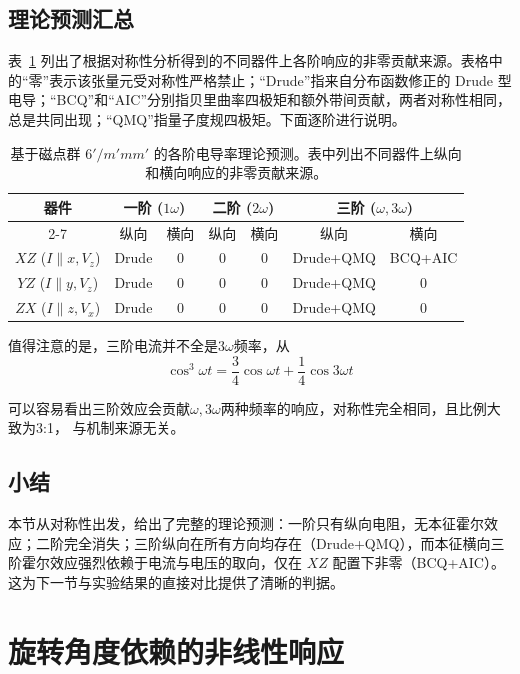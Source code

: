 \subsection{理论预测汇总}

表~\ref{tab:theory_prediction} 列出了根据对称性分析得到的不同器件上各阶响应的非零贡献来源。表格中的“零”表示该张量元受对称性严格禁止；“Drude”指来自分布函数修正的 Drude 型电导；“BCQ”和“AIC”分别指贝里曲率四极矩和额外带间贡献，两者对称性相同，总是共同出现；“QMQ”指量子度规四极矩。下面逐阶进行说明。

\begin{table}[htbp]
\centering
\caption{基于磁点群 \(6'/m'mm'\) 的各阶电导率理论预测。表中列出不同器件上纵向和横向响应的非零贡献来源。}
\label{tab:theory_prediction}
\begin{tabular}{c|cc|cc|cc}
\hline
\multirow{2}{*}{器件} & \multicolumn{2}{c|}{一阶 (\(1\omega\))} & \multicolumn{2}{c|}{二阶 (\(2\omega\))} & \multicolumn{2}{c}{三阶 (\(\omega,3\omega\))} \\
\cline{2-7}
 & 纵向 & 横向 & 纵向 & 横向 & 纵向 & 横向 \\
\hline
\(XZ\) (\(I\parallel x,V_z\)) & Drude & 0 & 0 & 0 & Drude+QMQ & BCQ+AIC \\
\(YZ\) (\(I\parallel y,V_z\)) & Drude & 0 & 0 & 0 & Drude+QMQ & 0 \\
\(ZX\) (\(I\parallel z,V_x\)) & Drude & 0 & 0 & 0 & Drude+QMQ & 0 \\
\hline
\end{tabular}
\end{table}

值得注意的是，三阶电流并不全是\(3\omega\)频率，从
\begin{equation}
\cos^3 \omega t = \frac{3}{4}\cos\omega t + \frac{1}{4}\cos 3\omega t
\label{eq:3to1} 
\end{equation}


可以容易看出三阶效应会贡献\(\omega,3\omega\)两种频率的响应，对称性完全相同，且比例大致为3:1，
与机制来源无关。
\subsection{小结}

本节从对称性出发，给出了完整的理论预测：一阶只有纵向电阻，无本征霍尔效应；二阶完全消失；三阶纵向在所有方向均存在（Drude+QMQ），而本征横向三阶霍尔效应强烈依赖于电流与电压的取向，仅在 \(XZ\) 配置下非零（BCQ+AIC）。这为下一节与实验结果的直接对比提供了清晰的判据。

\section{旋转角度依赖的非线性响应}
\label{sec:CrSb_application}

